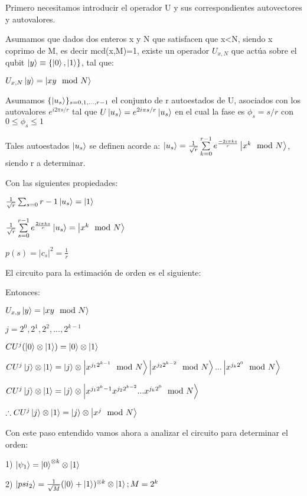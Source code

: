 Primero necesitamos introducir el operador U y sus correspondientes autovectores y autovalores.

Asumamos que dados dos enteros x y N que satisfacen que x<N, siendo x coprimo de M, es decir mcd(x,M)=1, existe un operador $U_{x,N}$ que actúa sobre el qubit $\ket{y} \equiv \{\ket{0}, \ket{1}\}$, tal que:

$U_{x,N} \ket{y} = \ket{x y \mod N}$

Asumamos $\{ \ket{u_s}\}_{s = 0, 1, ..., r-1}$ el conjunto de r autoestados de U, asociados con los autovalores $e^{i 2 \pi s/r}$ tal que $U \ket{u_s} = e^{2 i \pi s /r} \ket{u_s}$ en el cual la fase es $\phi_s = s/r$ con $0 \leq \phi_s \leq 1$

Tales autoestados $\ket{u_s}$ se definen acorde a: $\ket{u_s} = \frac{1}{\sqrt{r}} \sum\limits_{k=0}^{r-1} e^{\frac{-2 i \pi k s}{r}} \ket{x^k \mod N}$, siendo r a determinar.

Con las siguientes propiedades:

$\frac{1}{\sqrt{r}} \sum_{s=0}{r-1} \ket{u_s} = \ket{1}$

$\frac{1}{\sqrt{r}} \sum\limits_{s=0}^{r-1} e^{\frac{2 i \pi k s}{r}} \ket{u_s} = \ket{x^k \mod N}$

$p(s) = |c_s|^2 = \frac{1}{r}$

El circuito para la estimación de orden es el siguiente:


Entonces:

$U_{x,y} \ket{y} = \ket{x y \mod N}$

$j = 2^0, 2^1, 2^2, ..., 2^{k-1}$

$CU^j (\ket{0} \otimes \ket{1}) = \ket{0} \otimes \ket{1}$

$CU^j \ket{j} \otimes \ket{1} = \ket{j} \otimes \ket{x^{j_1 2^{k-1}} \mod N} \ket{x^{j_2 2^{k-2}} \mod N} ... \ket{x^{j_k 2^0} \mod N}$

$CU^j \ket{j} \otimes \ket{1} = \ket{j} \otimes \ket{x^{j_1 2^k-1} x^{j_2 2^{k-2}} ... x^{j_k 2^0} \mod N}$

$\therefore CU^j \ket{j} \otimes \ket{1} = \ket{j} \otimes \ket{x^j \mod N}$

Con este paso entendido vamos ahora a analizar el circuito para determinar el orden:

1) $\ket{\psi_1} = \ket{0}^{\otimes k} \otimes \ket{1}$

2) $\ket{psi_2} = \frac{1}{\sqrt{M}} (\ket{0} + \ket{1})^{\otimes k} \otimes \ket{1}; M=2^k$


